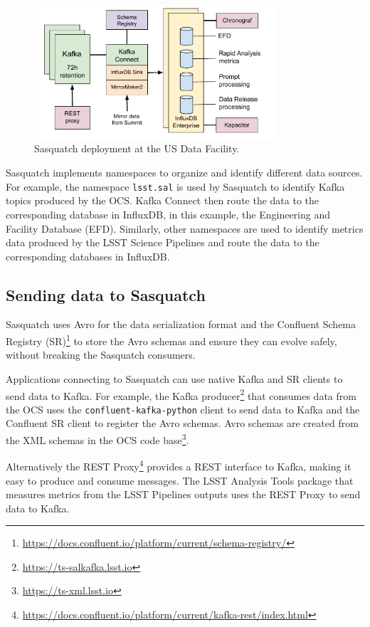 \begin{figure}[h]
    \centering
    \includegraphics[width=0.8\textwidth]{figures/sasquatch-architecture.pdf}
    \caption{Sasquatch deployment at the US Data Facility.}
    \label{fig:system-architecture}

\end{figure}

Sasquatch implements namespaces to organize and identify different data sources. For example, the namespace \texttt{lsst.sal} is used by Sasquatch to identify Kafka topics produced by the OCS. Kafka Connect then route the data to the corresponding database in InfluxDB, in this example, the Engineering and Facility Database (EFD). Similarly, other namespaces are used to identify metrics data produced by the LSST Science Pipelines and route the data to the corresponding databases in InfluxDB.

\subsection{Sending data to Sasquatch}

Sasquatch uses Avro for the data serialization format and the Confluent Schema Registry (SR)\footnote{\url{https://docs.confluent.io/platform/current/schema-registry/}} to store the Avro schemas and ensure they can evolve safely, without breaking the Sasquatch consumers.

Applications connecting to Sasquatch can use native Kafka and SR clients to send data to Kafka. For example, the Kafka producer\footnote{\url{https://ts-salkafka.lsst.io}} that consumes data from the OCS uses the \texttt{confluent-kafka-python} client to send data to Kafka and the Confluent SR client to register the Avro schemas. Avro schemas are created from the XML schemas in the OCS code base\footnote{\url{https://ts-xml.lsst.io}}.

Alternatively the REST Proxy\footnote{\url{https://docs.confluent.io/platform/current/kafka-rest/index.html}} provides a REST interface to Kafka, making it easy to produce and consume messages. The LSST Analysis Tools package that measures metrics from the LSST Pipelines outputs uses the REST Proxy to send data to Kafka.

